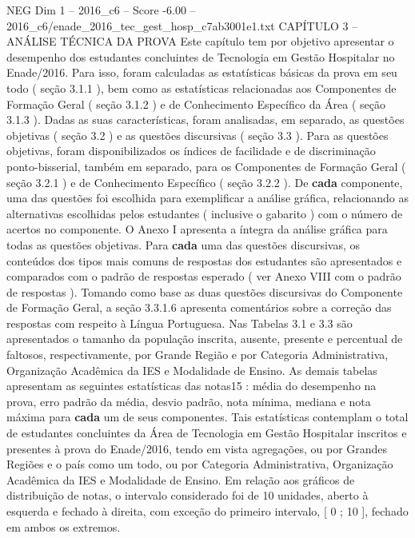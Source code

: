 \begin{textsample}{NEG Dim 1 – 2016\_c6 – Score -6.00 – 2016\_c6/enade\_2016\_tec\_gest\_hosp\_c7ab3001e1.txt}  \label{ex:f1_neg_045}
CAPÍTULO 3 – ANÁLISE TÉCNICA DA PROVA Este capítulo tem por objetivo apresentar o desempenho dos estudantes concluintes de Tecnologia em Gestão Hospitalar no Enade/2016.
Para isso, foram calculadas as estatísticas básicas da prova em seu todo ( seção 3.1.1 ), bem como as estatísticas relacionadas aos Componentes de Formação Geral ( seção 3.1.2 ) e de Conhecimento Específico da Área ( seção 3.1.3 ).
Dadas as suas características, foram analisadas, em separado, as questões objetivas ( seção 3.2 ) e as questões discursivas ( seção 3.3 ).
Para as questões objetivas, foram disponibilizados os índices de facilidade e de discriminação ponto-bisserial, também em separado, para os Componentes de Formação Geral ( seção 3.2.1 ) e de Conhecimento Específico ( seção 3.2.2 ).
De \textbf{cada} componente, uma das questões foi escolhida para exemplificar a análise gráfica, relacionando as alternativas escolhidas pelos estudantes ( inclusive o gabarito ) com o número de acertos no componente.
O Anexo I apresenta a íntegra da análise gráfica para todas as questões objetivas.
Para \textbf{cada} uma das questões discursivas, os conteúdos dos tipos mais comuns de respostas dos estudantes são apresentados e comparados com o padrão de respostas esperado ( ver Anexo VIII com o padrão de respostas ).
Tomando como base as duas questões discursivas do Componente de Formação Geral, a seção 3.3.1.6 apresenta comentários sobre a correção das respostas com respeito à Língua Portuguesa.
Nas Tabelas 3.1 e 3.3 são apresentados o tamanho da população inscrita, ausente, presente e percentual de faltosos, respectivamente, por Grande Região e por Categoria Administrativa, Organização Acadêmica da IES e Modalidade de Ensino.
As demais tabelas apresentam as seguintes estatísticas das notas15 : média do desempenho na prova, erro padrão da média, desvio padrão, nota mínima, mediana e nota máxima para \textbf{cada} um de seus componentes.
Tais estatísticas contemplam o total de estudantes concluintes da Área de Tecnologia em Gestão Hospitalar inscritos e presentes à prova do Enade/2016, tendo em vista agregações, ou por Grandes Regiões e o país como um todo, ou por Categoria Administrativa, Organização Acadêmica da IES e Modalidade de Ensino.
Em relação aos gráficos de distribuição de notas, o intervalo considerado foi de 10 unidades, aberto à esquerda e fechado à direita, com exceção do primeiro intervalo, [ 0 ; 10 ], fechado em ambos os extremos.

\end{textsample}
